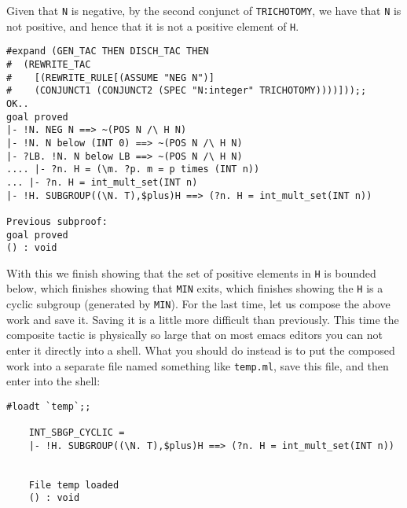 Given that {\small\tt N} is negative, by the second conjunct of
{\small\verb+TRICHOTOMY+}, we have that {\small\tt N} is not positive,
and hence that it is not a positive element of {\small\tt H}.
\begin{session}
\begin{verbatim}
#expand (GEN_TAC THEN DISCH_TAC THEN
#  (REWRITE_TAC
#    [(REWRITE_RULE[(ASSUME "NEG N")]
#    (CONJUNCT1 (CONJUNCT2 (SPEC "N:integer" TRICHOTOMY))))]));;
OK..
goal proved
|- !N. NEG N ==> ~(POS N /\ H N)
|- !N. N below (INT 0) ==> ~(POS N /\ H N)
|- ?LB. !N. N below LB ==> ~(POS N /\ H N)
.... |- ?n. H = (\m. ?p. m = p times (INT n))
... |- ?n. H = int_mult_set(INT n)
|- !H. SUBGROUP((\N. T),$plus)H ==> (?n. H = int_mult_set(INT n))

Previous subproof:
goal proved
() : void
\end{verbatim}
\end{session}

With this we finish showing that the set of positive elements in
{\small\tt H} is bounded below, which finishes showing that
{\small\verb+MIN+} exits, which finishes showing the {\small\tt H} is
a cyclic subgroup  (generated by {\small\verb+MIN+}).  For the last
time, let us compose the above work and save it.   Saving it is a
little more difficult than previously.  This time the composite tactic
is physically so large that on most emacs editors you can not enter it
directly into a shell.  What you should do instead is to put the
composed work into a separate file named something like
{\small\verb+temp.ml+}, save this file, and then enter into the shell:
\begin{session}
\begin{verbatim}
#loadt `temp`;;

	INT_SBGP_CYCLIC = 
	|- !H. SUBGROUP((\N. T),$plus)H ==> (?n. H = int_mult_set(INT n))


	File temp loaded
	() : void

\end{verbatim}
\end{session}

